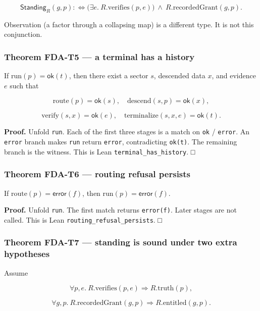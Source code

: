 \documentclass[
  11pt,
]{article}
\begin{document}
\[
\mathsf{Standing}_R(g,p)
:\iff
\bigl(\exists e.\ R.\mathrm{verifies}(p,e)\bigr)
\ \wedge\
R.\mathrm{recordedGrant}(g,p).
\]

Observation (a factor through a collapsing map) is a different type. It is not this conjunction.

\subsubsection{Theorem FDA-T5 --- a terminal has a history}\label{theorem-fda-t5-a-terminal-has-a-history}

If \(\mathrm{run}(p)=\mathsf{ok}(t)\), then there exist a sector \(s\), descended data \(x\), and evidence \(e\) such that

\[
\mathrm{route}(p)=\mathsf{ok}(s),\quad
\mathrm{descend}(s,p)=\mathsf{ok}(x),
\]

\[
\mathrm{verify}(s,x)=\mathsf{ok}(e),\quad
\mathrm{terminalize}(s,x,e)=\mathsf{ok}(t).
\]

\textbf{Proof.} Unfold \texttt{run}. Each of the first three stages is a match on \texttt{ok} / \texttt{error}. An \texttt{error} branch makes \texttt{run} return \texttt{error}, contradicting \texttt{ok(t)}. The remaining branch is the witness. This is Lean \nolinkurl{terminal_has_history}. □

\subsubsection{Theorem FDA-T6 --- routing refusal persists}\label{theorem-fda-t6-routing-refusal-persists}

If \(\mathrm{route}(p)=\mathsf{error}(f)\), then \(\mathrm{run}(p)=\mathsf{error}(f)\).

\textbf{Proof.} Unfold \texttt{run}. The first match returns \texttt{error(f)}. Later stages are not called. This is Lean \nolinkurl{routing_refusal_persists}. □

\subsubsection{Theorem FDA-T7 --- standing is sound under two extra hypotheses}\label{theorem-fda-t7-standing-is-sound-under-two-extra-hypotheses}

Assume

\[
\forall p,e.\ R.\mathrm{verifies}(p,e)\Rightarrow R.\mathrm{truth}(p),
\]

\[
\forall g,p.\ R.\mathrm{recordedGrant}(g,p)\Rightarrow R.\mathrm{entitled}(g,p).
\]
\end{document}
